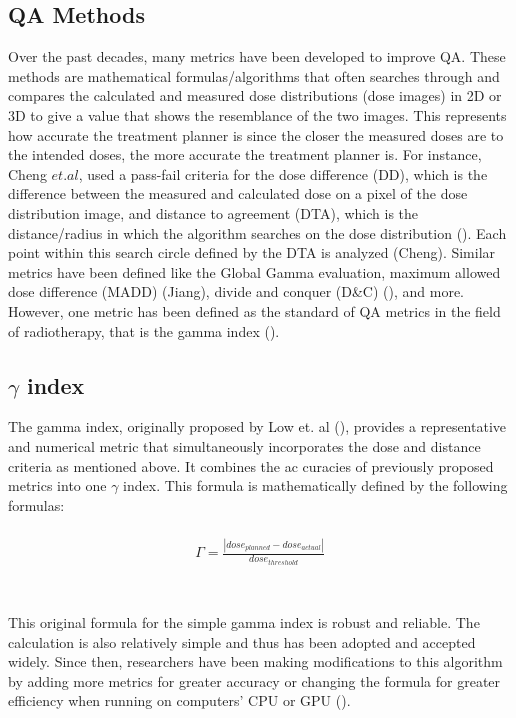\documentclass[12pt]{article}
\begin{document}
\subsection{QA Methods}
Over the past decades, many metrics have been developed to improve QA. These methods are mathematical formulas/algorithms that often searches through and compares the calculated and measured dose distributions (dose images) in 2D or 3D to give a value that shows the resemblance of the two images. This represents how accurate the treatment planner is since the closer the measured doses are to the intended doses, the more accurate the treatment planner is. For instance, Cheng $et. al$, used a pass-fail criteria for the dose difference (DD), which is the difference between the measured and calculated dose on a pixel of the dose distribution image, and distance to agreement (DTA), which is the distance/radius in which the algorithm searches on the dose distribution (\textcite{Cheng}). Each point within this search circle defined by the DTA is analyzed (Cheng). Similar metrics have been defined like the Global Gamma evaluation, maximum allowed dose difference (MADD) (Jiang), divide and conquer (D\&C) (\textcite{Stojadinovic}), and more. However, one metric has been defined as the standard of QA metrics in the field of radiotherapy, that is the gamma index (\textcite{Low}).

\subsection{$\gamma$ index}
The gamma index, originally proposed by Low et. al (\textcite{Low}), provides a representative and numerical metric that simultaneously incorporates the dose and distance criteria as mentioned above. It combines the ac curacies of previously proposed metrics into one $\gamma$ index. This formula is mathematically defined by the following formulas:
\\
\\
\begin{align}
  \Gamma = \frac{|dose_{planned} - dose_{actual}|}{dose_{threshold}} \\
\end{align}
\\
\\
This original formula for the simple gamma index is robust and reliable. The calculation is also relatively simple and thus has been adopted and accepted widely. Since then, researchers have been making modifications to this algorithm by adding more metrics for greater accuracy or changing the formula for greater efficiency when running on computers' CPU or GPU (\textcite{Gu}).
\end{document}
